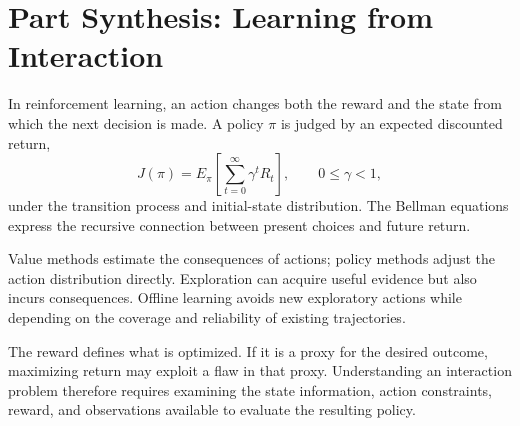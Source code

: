 \chapter*{Part Synthesis: Learning from Interaction}

In reinforcement learning, an action changes both the reward and the state from which the next decision is made. A policy $\pi$ is judged by an expected discounted return,
\[
J(\pi)=E_{\pi}\!\left[\sum_{t=0}^{\infty}\gamma^tR_t\right],
\qquad 0\le\gamma<1,
\]
under the transition process and initial-state distribution. The Bellman equations express the recursive connection between present choices and future return.

Value methods estimate the consequences of actions; policy methods adjust the action distribution directly. Exploration can acquire useful evidence but also incurs consequences. Offline learning avoids new exploratory actions while depending on the coverage and reliability of existing trajectories.

The reward defines what is optimized. If it is a proxy for the desired outcome, maximizing return may exploit a flaw in that proxy. Understanding an interaction problem therefore requires examining the state information, action constraints, reward, and observations available to evaluate the resulting policy.

\clearpage
\begingroup\pagestyle{empty}\cleardoublepage\endgroup
